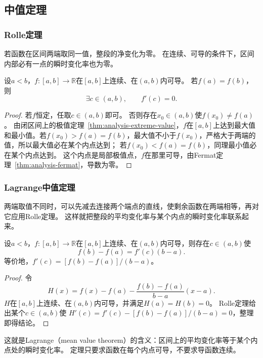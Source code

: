 \subsection{中值定理}

\subsubsection{Rolle定理}
若函数在区间两端取同一值，整段的净变化为零。
在连续、可导的条件下，区间内部必有一点的瞬时变化率也为零。
\begin{theorem}[Rolle定理]
\label{thm:analysis-rolle}
设$a<b$，$f:[a,b]\to\mathbb R$在$[a,b]$上连续、在$(a,b)$内可导。
若$f(a)=f(b)$，则
\[
 \exists c\in(a,b),\qquad f'(c)=0.
\]
\end{theorem}
\begin{proof}
若$f$恒定，任取$c\in(a,b)$即可。
否则存在$x_0\in(a,b)$使$f(x_0)\neq f(a)$。
由闭区间上的极值定理~\ref{thm:analysis-extreme-value}，$f$在$[a,b]$上达到最大值和最小值。若$f(x_0)>f(a)=f(b)$，最大值不小于$f(x_0)$，严格大于两端的值，所以最大值必在某个内点达到；
若$f(x_0)<f(a)=f(b)$，同理最小值必在某个内点达到。
这个内点是局部极值点，$f$在那里可导，由Fermat定理~\ref{thm:analysis-fermat}，导数为零。
\end{proof}

\subsubsection{Lagrange中值定理}
两端取值不同时，可以先减去连接两个端点的直线，使剩余函数在两端相等，再对它应用Rolle定理。
这样就把整段的平均变化率与某个内点的瞬时变化率联系起来。
\begin{theorem}[Lagrange中值定理]
\label{thm:analysis-lagrange-mean-value}
设$a<b$，$f:[a,b]\to\mathbb R$在$[a,b]$上连续、在$(a,b)$内可导，则存在$c\in(a,b)$使
\begin{equation}
 f(b)-f(a)=f'(c)(b-a).
\label{eq:analysis-mean-value-theorem}
\end{equation}
等价地，$f'(c)=[f(b)-f(a)]/(b-a)$。
\end{theorem}
\begin{proof}
令
\[
 H(x)=f(x)-f(a)-\frac{f(b)-f(a)}{b-a}(x-a).
\]
$H$在$[a,b]$上连续、在$(a,b)$内可导，并满足$H(a)=H(b)=0$。
Rolle定理给出某个$c\in(a,b)$使
$H'(c)=f'(c)-[f(b)-f(a)]/(b-a)=0$，整理即得结论。
\end{proof}
这就是Lagrange（mean value theorem）的含义：区间上的平均变化率等于某个内点处的瞬时变化率。
定理只要求函数在每个内点可导，不要求导函数连续。

